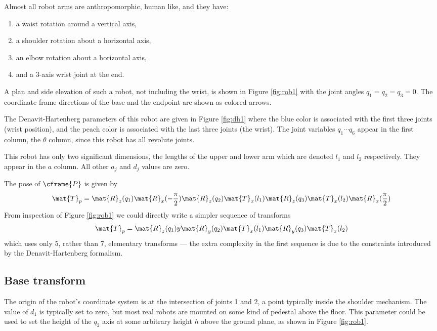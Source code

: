 \documentclass[11pt]{article}
\numberwithin{equation}{section}
\begin{document}
Almost all robot arms are anthropomorphic, human like, and they have:
\begin{enumerate}
\item a waist rotation around a vertical axis, 
\item a shoulder rotation about a horizontal axis, 
\item an elbow rotation about a horizontal axis,
\item and a 3-axis wrist joint at the end.
\end{enumerate}

A plan and side elevation of such a robot, not including the wrist, is shown in Figure \ref{fig:rob1} with the joint angles $q_1=q_2=q_3 =0$.
The coordinate
frame directions of the base and the endpoint are shown as colored arrows.

The Denavit-Hartenberg parameters of this robot are given in Figure \ref{fig:dh1} where the blue color is associated with the first three joints (wrist position), and the peach color is associated with the last three joints (the wrist).
The joint variables $q_1 \cdots q_6$ appear in the first column, the $\theta$ column, since this robot has all revolute joints.

This robot has only two significant dimensions, the lengths of the upper and lower arm which are denoted $l_1$ and $l_2$ respectively.  They appear in the $a$ column.  All other $a_j$ and $d_j$ values are zero.

The pose of $\cframe{P}$ is given by
\[
\mat{T}_p = \mat{R}_z(q_1) \mat{R}_x(-\frac{\pi}{2}) \mat{R}_z(q_2)  \mat{T}_x(l_1) \mat{R}_z(q_3) \mat{T}_x(l_2) \mat{R}_x(\frac{\pi}{2})
\]
From inspection of Figure \ref{fig:rob1} we could directly write\cite{Corke07a} a  simpler sequence of transforms
\[
\mat{T}_p = \mat{R}_z(q_1)y \mat{R}_y(q_2)  \mat{T}_x(l_1) \mat{R}_y(q_3) \mat{T}_x(l_2) 
\]
which uses only 5, rather than 7, elementary transforms --- the extra complexity in the first sequence is due to the constraints introduced by the 
Denavit-Hartenberg formalism.

\subsection{Base transform}
The origin of the robot's coordinate system is at the intersection of joints 1 and 2, a point typically inside the shoulder mechanism.
The value of $d_1$ is typically set to zero, but most real robots are mounted on some kind of pedestal above the floor.
This parameter could be used to set the height of the $q_2$ axis at some arbitrary height $h$ above the
ground plane, as shown in Figure  \ref{fig:rob1}.
\end{document}
